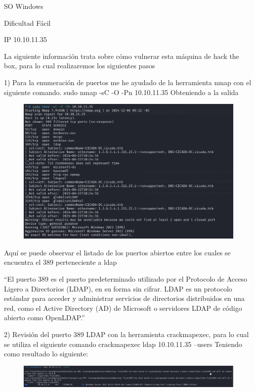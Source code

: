 \documentclass[
  letterpaper,
  DIV=11,
  numbers=noendperiod]{scrreprt}
\begin{document}
SO Windows

Dificultad Fácil

IP 10.10.11.35

La siguiente información trata sobre cómo vulnerar esta máquina de hack
the box, para lo cual realizaremos los siguientes pasos

1) Para la enumeración de puertos me he ayudado de la herramienta nmap
con el siguiente comando. sudo nmap -sC -O -Pn 10.10.11.35 Obteniendo a
la salida

\begin{figure}

{\centering \includegraphics{Unidades/unidad10/imagenes/2.png}

}

\end{figure}

Aquí se puede observar el listado de los puertos abiertos entre los
cuales se encuentra el 389 perteneciente a ldap

``El puerto 389 es el puerto predeterminado utilizado por el Protocolo
de Acceso Ligero a Directorios (LDAP), en su forma sin cifrar. LDAP es
un protocolo estándar para acceder y administrar servicios de
directorios distribuidos en una red, como el Active Directory (AD) de
Microsoft o servidores LDAP de código abierto como OpenLDAP.''

2) Revisión del puerto 389 LDAP con la herramienta crackmapexec, para lo
cual se utiliza el siguiente comando crackmapexec ldap 10.10.11.35
--users Teniendo como resultado lo siguiente:

\begin{figure}

{\centering \includegraphics{Unidades/unidad10/imagenes/3.png}

}

\end{figure}
\end{document}
